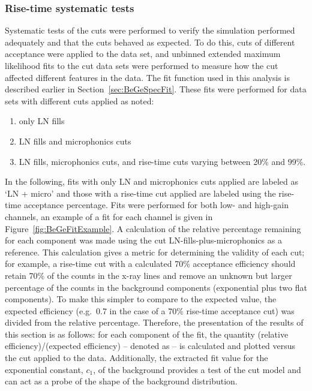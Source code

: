 		\subsubsection{Rise-time systematic tests}
		\label{sec:RisetimeSystematicTests}	
	
	Systematic tests of the cuts were performed to verify the simulation performed adequately and that the cuts behaved as expected.  To do this, cuts of different acceptance were applied to the data set, and unbinned extended maximum likelihood fits to the cut data sets were performed to measure how the cut affected different features in the data.  The fit function used in this analysis is described earlier in Section~\ref{sec:BeGeSpecFit}.  These fits were performed for data sets with different cuts applied as noted:

					\begin{enumerate}
						\item only LN fills 
						\item LN fills and microphonics cuts
						\item LN fills, microphonics cuts, and rise-time cuts varying between 20\% and 99\%.
					\end{enumerate}

In the following, fits with only LN and microphonics cuts applied are labeled as `LN + micro' and those with a rise-time cut applied are labeled using the rise-time acceptance percentage.  
Fits were performed for both low- and high-gain channels, an example of a fit for each channel is given in Figure~\ref{fig:BeGeFitExample}.  A calculation of the relative percentage remaining for each component was made using the cut LN-fills-plus-microphonics as a reference.  This calculation gives a metric for determining the validity of each cut; for example, a rise-time cut with a calculated 70\% acceptance efficiency should retain 70\% of the counts in the x-ray lines and remove an unknown but larger percentage of the counts in the background components (exponential plus two flat components).  To make this simpler to compare to the expected value, the expected efficiency (e.g.~0.7 in the case of a 70\% rise-time acceptance cut) was divided from the relative percentage.  Therefore, the presentation of the results of this section is as follows: for each component of the fit, the quantity (relative efficiency)/(expected efficiency) -- denoted as \releff-- is calculated and plotted versus the cut applied to the data.  Additionally, the extracted fit value for the exponential constant, $c_{1}$, of the background provides a test of the cut model and can act as a probe of the shape of the background distribution.  
	
